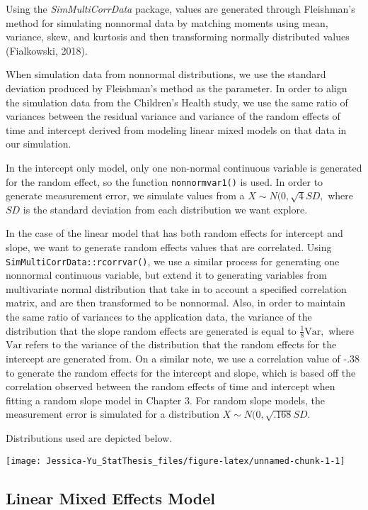 \documentclass[12pt, twoside]{amherstthesis}
\begin{document}
Using the \emph{SimMultiCorrData} package, values are generated through Fleishman's method for simulating nonnormal data by matching moments using mean, variance, skew, and kurtosis and then transforming normally distributed values (Fialkowski, 2018).

When simulation data from nonnormal distributions, we use the standard deviation produced by Fleishman's method as the parameter. In order to align the simulation data from the Children's Health study, we use the same ratio of variances between the residual variance and variance of the random effects of time and intercept derived from modeling linear mixed models on that data in our simulation.

In the intercept only model, only one non-normal continuous variable is generated for the random effect, so the function \texttt{nonnormvar1()} is used. In order to generate measurement error, we simulate values from a \(X\sim\mathit{N}(0,\sqrt{4}SD,\) where \(SD\) is the standard deviation from each distribution we want explore.

In the case of the linear model that has both random effects for intercept and slope, we want to generate random effects values that are correlated. Using \texttt{SimMultiCorrData::rcorrvar()}, we use a similar process for generating one nonnormal continuous variable, but extend it to generating variables from multivariate normal distribution that take in to account a specified correlation matrix, and are then transformed to be nonnormal. Also, in order to maintain the same ratio of variances to the application data, the variance of the distribution that the slope random effects are generated is equal to \(\frac{1}{8}\text{Var},\) where \(\text{Var}\) refers to the variance of the distribution that the random effects for the intercept are generated from. On a similar note, we use a correlation value of -.38 to generate the random effects for the intercept and slope, which is based off the correlation observed between the random effects of time and intercept when fitting a random slope model in Chapter 3. For random slope models, the measurement error is simulated for a distribution \(X\sim\mathit{N}(0,\sqrt{.168}SD.\)

Distributions used are depicted below.
\begin{center}\texttt{[image: Jessica-Yu\_StatThesis\_files/figure-latex/unnamed-chunk-1-1]} \end{center}

\hypertarget{linear-mixed-effects-model}{%
\subsection{Linear Mixed Effects Model}\label{linear-mixed-effects-model}}
\end{document}
